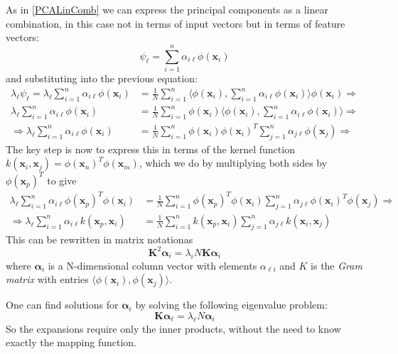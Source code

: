 \documentclass[12pt, letterpaper]{article}
\theoremstyle{definition}
\newcommand{\x}{\mathbf{x}}
\let\ti\textit
\begin{document}
As in \autoref{PCALinComb} we can express the principal components as a linear combination, in this case not in terms of input vectors but in terms of feature vectors:
\begin{equation}
\psi_\ell  = \sum_{i=1}^n \alpha_{i\ell} \phi(\x_i)
\end{equation}
and substituting into the previous equation:
\begin{equation}
\begin{aligned}
\lambda_\ell \psi_\ell  = \lambda_\ell \sum_{i=1}^n \alpha_{i\ell} \phi(\x_i) &= 
\frac{1}{N}\sum_{i=1}^n \langle \phi(\x_i), \sum_{i=1}^n \alpha_{i\ell} \phi(\x_i)
\rangle \phi(\x_i)\Rightarrow\\
\lambda_\ell \sum_{i=1}^n \alpha_{i\ell} \phi(\x_i) &= \frac{1}{N}\sum_{i=1}^n \phi(\x_i)\langle \phi(\x_i), \sum_{i=1}^n \alpha_{i\ell} \phi(\x_i)
\rangle \Rightarrow\\
\Rightarrow \lambda_\ell \sum_{i=1}^n \alpha_{i\ell} \phi(\x_i) &= 
\frac{1}{N}\sum_{i=1}^n \phi(\x_i) \phi(\x_i)^T \sum_{j=1}^n \alpha_{j\ell} \phi(\x_j)  \Rightarrow
\end{aligned}
\end{equation}
The key step is now to express this in terms of the kernel function $k(\x_i , \x_j ) =
\phi(\x_n)^T\phi(\x_m )$, which we do by multiplying both sides by $\phi(\x_p)^T$ to give
\begin{equation}
\begin{aligned}
 \lambda_\ell \sum_{i=1}^n \alpha_{i\ell} \phi(\x_p)^T\phi(\x_i) &= 
\frac{1}{N}\sum_{i=1}^n \phi(\x_p)^T\phi(\x_i)  \sum_{j=1}^n \alpha_{j\ell} \phi(\x_i)^T\phi(\x_j)\Rightarrow\\
\Rightarrow  \lambda_\ell \sum_{i=1}^n \alpha_{i\ell} k(\x_p,\x_i) &= 
\frac{1}{N}\sum_{i=1}^n k(\x_p,\x_i)  \sum_{j=1}^n \alpha_{j\ell} k(\x_i,\x_j)
\end{aligned}
\end{equation}
This can be rewritten in matrix notationas
\begin{equation}
\mathbf{K}^2\mathbf{\alpha}_i = \lambda_i N  \mathbf{K} \mathbf{\alpha}_i
\end{equation}
where $\mathbf{\alpha}_i$ is a N-dimensional column vector with elements $\alpha_{\ell i}$ and $K$ is the \ti{Gram matrix} with entries $\langle \phi(\x_i), \phi(\x_j)\rangle$.

One can find solutions for $\mathbf{\alpha}_i$ by solving the following eigenvalue problem:
\begin{equation}
\mathbf{K\alpha}_\ell = \lambda_\ell N\mathbf{\alpha}_i
\end{equation}
So the expansions require only the inner products, without the need to know exactly the mapping function.
\end{document}
